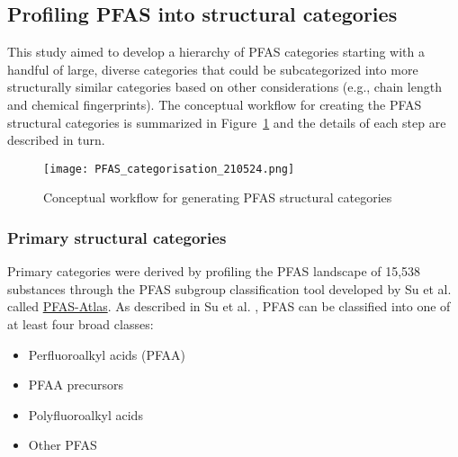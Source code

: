 \documentclass[
  super,
  preprint,
  3p]{elsarticle}
\providecommand{\tightlist}{%
  \setlength{\itemsep}{0pt}\setlength{\parskip}{0pt}}\usepackage{longtable,booktabs,array}
\begin{document}
\hypertarget{profiling-pfas-into-structural-categories}{%
\subsection{Profiling PFAS into structural
categories}\label{profiling-pfas-into-structural-categories}}

This study aimed to develop a hierarchy of PFAS categories starting with
a handful of large, diverse categories that could be subcategorized into
more structurally similar categories based on other considerations
(e.g., chain length and chemical fingerprints). The conceptual workflow
for creating the PFAS structural categories is summarized in
Figure~\ref{fig-categorisation} and the details of each step are
described in turn.

\begin{figure}

{\centering \texttt{[image: PFAS\_categorisation\_210524.png]}

}

\caption{\label{fig-categorisation}Conceptual workflow for generating
PFAS structural categories}

\end{figure}

\hypertarget{sec-primary-categories}{%
\subsubsection{Primary structural
categories}\label{sec-primary-categories}}

Primary categories were derived by profiling the PFAS landscape of
15,538 substances through the PFAS subgroup classification tool
developed by Su et al. \citep{Su_2024} called
\href{https://www.pfas-atlas.net}{PFAS-Atlas}. As described in Su et al.
\citep{Su_2024}, PFAS can be classified into one of at least four broad
classes:

\begin{itemize}
\tightlist
\item
  Perfluoroalkyl acids (PFAA)
\item
  PFAA precursors
\item
  Polyfluoroalkyl acids
\item
  Other PFAS
\end{itemize}
\end{document}
